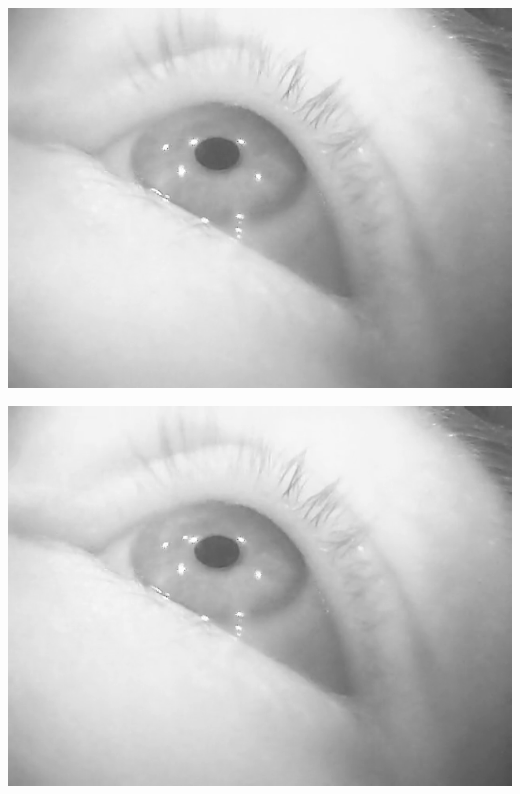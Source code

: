 \documentclass[Bachelorarbeit.tex]{subfiles}
\begin{document}
\begin{center}
\begin{minipage}{0.48\linewidth}
\includegraphics[width=\linewidth]{Images/flicker_1.png}
\end{minipage}
\begin{minipage}{0.48\linewidth}
\includegraphics[width=\linewidth]{Images/flicker_2.png}
\end{minipage}
\label{flicker_figure}

\end{center}
\end{document}
